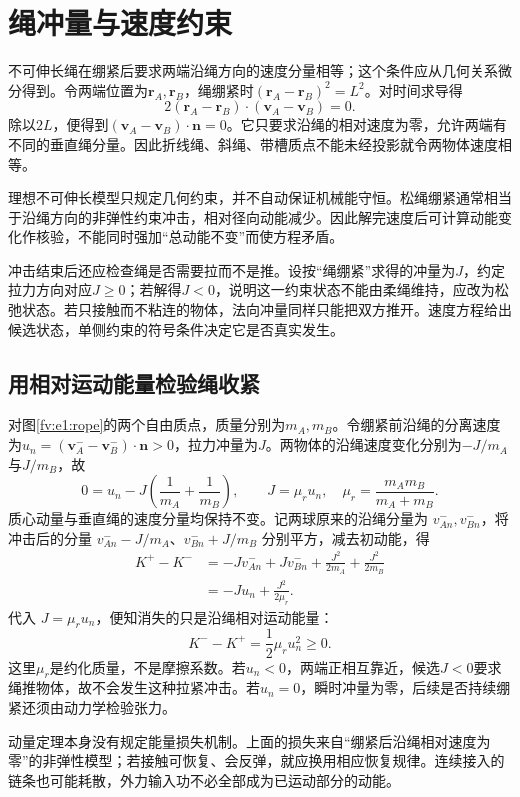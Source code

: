 \section{绳冲量与速度约束}

不可伸长绳在绷紧后要求两端沿绳方向的速度分量相等；这个条件应从几何关系微分得到。令两端位置为$\bm r_A,\bm r_B$，绳绷紧时$(\bm r_A-\bm r_B)^2=L^2$。对时间求导得
\[2(\bm r_A-\bm r_B)\cdot(\bm v_A-\bm v_B)=0.\]
除以$2L$，便得到$(\bm v_A-\bm v_B)\cdot\bm n=0$。它只要求沿绳的相对速度为零，允许两端有不同的垂直绳分量。因此折线绳、斜绳、带槽质点不能未经投影就令两物体速度相等。



理想不可伸长模型只规定几何约束，并不自动保证机械能守恒。松绳绷紧通常相当于沿绳方向的非弹性约束冲击，相对径向动能减少。因此解完速度后可计算动能变化作核验，不能同时强加“总动能不变”而使方程矛盾。

冲击结束后还应检查绳是否需要拉而不是推。设按“绳绷紧”求得的冲量为$J$，约定拉力方向对应$J\ge0$；若解得$J<0$，说明这一约束状态不能由柔绳维持，应改为松弛状态。若只接触而不粘连的物体，法向冲量同样只能把双方推开。速度方程给出候选状态，单侧约束的符号条件决定它是否真实发生。



\subsection{用相对运动能量检验绳收紧}
对图\ref{fv:e1:rope}的两个自由质点，质量分别为$m_A,m_B$。令绷紧前沿绳的分离速度为$u_n=(\bm v_A^- -\bm v_B^-)\cdot\bm n>0$，拉力冲量为$J$。两物体的沿绳速度变化分别为$-J/m_A$与$J/m_B$，故
\[
0=u_n-J\left(\frac1{m_A}+\frac1{m_B}\right),\qquad
J=\mu_r u_n,\quad \mu_r=\frac{m_Am_B}{m_A+m_B}.
\]
质心动量与垂直绳的速度分量均保持不变。记两球原来的沿绳分量为 $v_{An}^-,v_{Bn}^-$，将冲击后的分量 $v_{An}^- -J/m_A$、$v_{Bn}^-+J/m_B$ 分别平方，减去初动能，得
\begin{align*}
K^+-K^-&=-Jv_{An}^-+Jv_{Bn}^-
+\frac{J^2}{2m_A}+\frac{J^2}{2m_B}\\
&=-Ju_n+\frac{J^2}{2\mu_r}.
\end{align*}
代入 $J=\mu_ru_n$，便知消失的只是沿绳相对运动能量：
\[
K^- -K^+=\frac12\mu_r u_n^2\ge0.
\]
这里$\mu_r$是约化质量，不是摩擦系数。若$u_n<0$，两端正相互靠近，候选$J<0$要求绳推物体，故不会发生这种拉紧冲击。若$u_n=0$，瞬时冲量为零，后续是否持续绷紧还须由动力学检验张力。

动量定理本身没有规定能量损失机制。上面的损失来自“绷紧后沿绳相对速度为零”的非弹性模型；若接触可恢复、会反弹，就应换用相应恢复规律。连续接入的链条也可能耗散，外力输入功不必全部成为已运动部分的动能。

